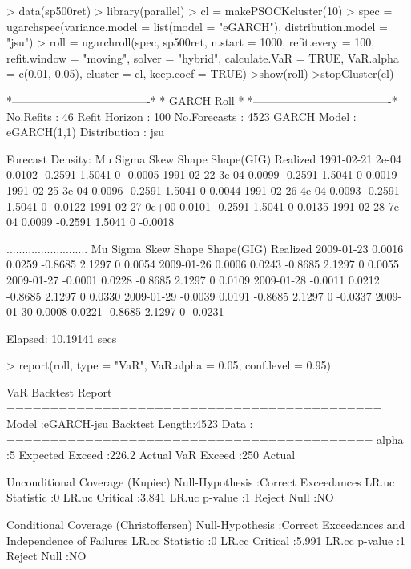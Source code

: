 \begin{Schunk}
\begin{Sinput}
> data(sp500ret)
> library(parallel)
> cl = makePSOCKcluster(10)
> spec = ugarchspec(variance.model = list(model = "eGARCH"), distribution.model = "jsu")
> roll = ugarchroll(spec, sp500ret, n.start = 1000, refit.every = 100,
refit.window = "moving", solver = "hybrid", calculate.VaR = TRUE,
VaR.alpha = c(0.01, 0.05), cluster = cl, keep.coef = TRUE)
>show(roll)
>stopCluster(cl)
\end{Sinput}
\begin{Soutput}
*-------------------------------------*
*              GARCH Roll             *
*-------------------------------------*
No.Refits       : 46
Refit Horizon   : 100
No.Forecasts    : 4523
GARCH Model     : eGARCH(1,1)
Distribution    : jsu

Forecast Density:
              Mu  Sigma    Skew  Shape Shape(GIG) Realized
1991-02-21 2e-04 0.0102 -0.2591 1.5041          0  -0.0005
1991-02-22 3e-04 0.0099 -0.2591 1.5041          0   0.0019
1991-02-25 3e-04 0.0096 -0.2591 1.5041          0   0.0044
1991-02-26 4e-04 0.0093 -0.2591 1.5041          0  -0.0122
1991-02-27 0e+00 0.0101 -0.2591 1.5041          0   0.0135
1991-02-28 7e-04 0.0099 -0.2591 1.5041          0  -0.0018

..........................
                Mu  Sigma    Skew  Shape Shape(GIG) Realized
2009-01-23  0.0016 0.0259 -0.8685 2.1297          0   0.0054
2009-01-26  0.0006 0.0243 -0.8685 2.1297          0   0.0055
2009-01-27 -0.0001 0.0228 -0.8685 2.1297          0   0.0109
2009-01-28 -0.0011 0.0212 -0.8685 2.1297          0   0.0330
2009-01-29 -0.0039 0.0191 -0.8685 2.1297          0  -0.0337
2009-01-30  0.0008 0.0221 -0.8685 2.1297          0  -0.0231

Elapsed: 10.19141 secs
\end{Soutput}
\begin{Sinput}
> report(roll, type = "VaR", VaR.alpha = 0.05, conf.level = 0.95)


\end{Sinput}
\begin{Soutput}
VaR Backtest Report
===========================================
Model          :eGARCH-jsu
Backtest Length:4523
Data           :
==========================================
alpha               :5%
Expected Exceed     :226.2
Actual VaR Exceed   :250
Actual %

Unconditional Coverage (Kupiec)
Null-Hypothesis     :Correct Exceedances
LR.uc Statistic     :0
LR.uc Critical      :3.841
LR.uc p-value       :1
Reject Null         :NO

Conditional Coverage (Christoffersen)
Null-Hypothesis     :Correct Exceedances and
                    Independence of Failures
LR.cc Statistic     :0
LR.cc Critical      :5.991
LR.cc p-value       :1
Reject Null         :NO
\end{Soutput}
\end{Schunk}
